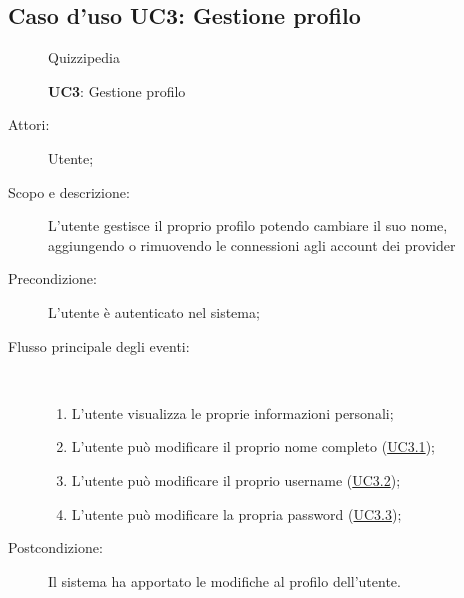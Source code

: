 \subsection{Caso d'uso UC3: Gestione profilo}
	\begin{figure}[H]
		\centering
		\begin{resizedtikzpicture}{\textwidth}
		\begin{umlsystem}[x=0, fill=lightgray!20]{Quizzipedia}
		\end{umlsystem}
		\end{resizedtikzpicture}
		\caption{\textbf{UC3}: Gestione profilo}
		\label{UC3}
	\end{figure}
\begin{description}
\item[Attori:] Utente;
\item[Scopo e descrizione:] L'utente gestisce il proprio profilo potendo cambiare il suo nome, aggiungendo o rimuovendo le connessioni agli account dei provider 
      \item[Precondizione:] L'utente è autenticato nel sistema;

        \item[Flusso principale degli eventi:] \ 
 \begin{enumerate}
          \item L’utente visualizza le proprie informazioni personali;
          \item L'utente può modificare il proprio nome completo (\hyperlink{UC3.1}{UC3.1});
          \item L'utente può modificare il proprio username	 (\hyperlink{UC3.2}{UC3.2});
          \item L'utente può modificare la propria password (\hyperlink{UC3.3}{UC3.3});

      \end{enumerate}
    \item[Postcondizione:] Il sistema ha apportato le modifiche al profilo dell'utente.
  \end{description}
\hypertarget{UC3.1}{}

